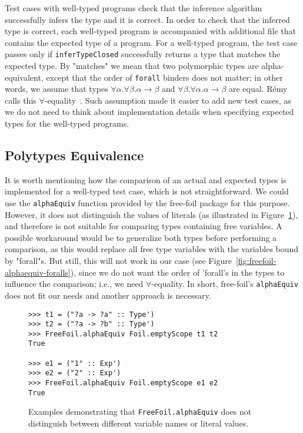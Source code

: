 Test cases with well-typed programs check that the inference algorithm successfully infers the type and it is correct. In order to check that the inferred type is correct, each well-typed program is accompanied with additional file that contains the expected type of a program. For a well-typed program, the test case passes only if \texttt{inferTypeClosed} successfully returns a type that matches the expected type. By "matches" we mean that two polymorphic types are alpha-equivalent, except that the order of \texttt{forall} binders does not matter; in other words, we assume that types $\forall \alpha. \forall \beta. \alpha \to \beta$ and $\forall \beta. \forall \alpha. \alpha \to \beta$ are equal. R\'emy calls this $\forall$-equality~\cite{Remy1992_SortedEqTheoryTypes}. Such assumption made it easier to add new test cases, as we do not need to think about implementation details when specifying expected types for the well-typed programs.

\subsection{Polytypes Equivalence}

It is worth mentioning how the comparison of an actual and expected types is implemented for a well-typed test case, which is not straightforward. We could use the \texttt{alphaEquiv} function provided by the free-foil package for this purpose. However, it does not distinguish the values of literals (as illustrated in Figure~\ref{fig:freefoil-alphaequiv-literals}), and therefore is not suitable for comparing types containing free variables. A possible workaround would be to generalize both types before performing a comparison, as this would replace all free type variables with the variables bound by "forall"s. But still, this will not work in our case (see Figure~\ref{fig:freefoil-alphaequiv-foralls}), since we do not want the order of 'forall's in the types to influence the comparison; i.e., we need $\forall$-equality. In short, free-foil's \texttt{alphaEquiv} does not fit our needs and another approach is necessary.

\begin{figure}[H]
  \begin{verbatim}
>>> t1 = ("?a -> ?a" :: Type')
>>> t2 = ("?a -> ?b" :: Type')
>>> FreeFoil.alphaEquiv Foil.emptyScope t1 t2
True

>>> e1 = ("1" :: Exp')
>>> e2 = ("2" :: Exp')
>>> FreeFoil.alphaEquiv Foil.emptyScope e1 e2
True
  \end{verbatim}
  \caption[\texttt{FreeFoil.alphaEquiv} usage examples (1)]{Examples demonstrating that \texttt{FreeFoil.alphaEquiv} does not distinguish between different variable names or literal values.}
  \label{fig:freefoil-alphaequiv-literals}
\end{figure}

